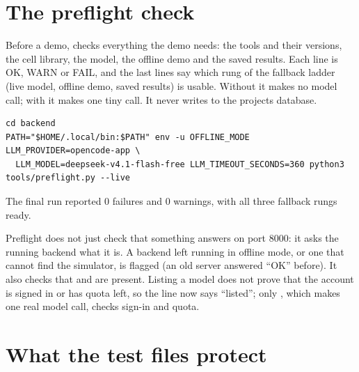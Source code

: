 \section{The preflight check}

Before a demo,  checks everything the demo needs: the tools and their versions, the cell library, the model, the offline demo and the saved results. Each line is OK, WARN or FAIL, and the last lines say which rung of the fallback ladder (live model, offline demo, saved results) is usable. Without  it makes no model call; with  it makes one tiny call. It never writes to the projects database.

\begin{lstlisting}[style=plain]
cd backend
PATH="$HOME/.local/bin:$PATH" env -u OFFLINE_MODE LLM_PROVIDER=opencode-app \
  LLM_MODEL=deepseek-v4.1-flash-free LLM_TIMEOUT_SECONDS=360 python3 tools/preflight.py --live
\end{lstlisting}

The final run reported 0 failures and 0 warnings, with all three fallback rungs ready.

Preflight does not just check that something answers on port 8000: it asks the running backend what it is. A backend left running in offline mode, or one that cannot find the simulator, is flagged (an old server answered ``OK'' before). It also checks that  and  are present. Listing a model does not prove that the account is signed in or has quota left, so the line now says ``listed''; only , which makes one real model call, checks sign-in and quota.

\section{What the test files protect}

